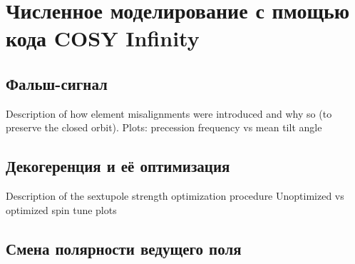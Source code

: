 \chapter{Численное моделирование с пмощью кода COSY Infinity} \label{chapt3}

\section{Фальш-сигнал} \label{sect3_1}
Description of how element misalignments were introduced and why so (to preserve the closed orbit). 
Plots: precession frequency vs mean tilt angle
\section{Декогеренция и её оптимизация}
Description of the sextupole strength optimization procedure
Unoptimized vs optimized spin tune plots
\section{Смена полярности ведущего поля} \label{sect3_2}

\clearpage
